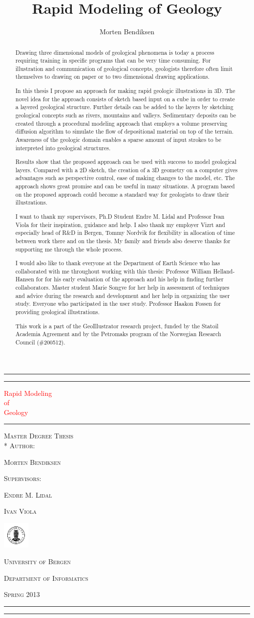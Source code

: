 \documentclass[a4paper,12pt]{report}
\title{Rapid Modeling of Geology}
\author{Morten Bendiksen}
\newcommand*{\plogo}{\includegraphics[width=0.1\textwidth]{uiblogo.pdf}} %
\newcommand*{\titleAT}{\begingroup %
\newlength{\drop} %
\drop=0.06\textheight %

\rule{\textwidth}{1pt}\par %
\vspace{2pt}\vspace{-\baselineskip} %
\rule{\textwidth}{0.4pt}\par %

\vspace{\drop} %
\centering %
\textcolor{Red}{ %
{\Huge Rapid Modeling}\\[0.5\baselineskip] %
{\Large of}\\[0.75\baselineskip] %
{\Huge Geology}} %

\vspace{0.25\drop} %
\rule{0.3\textwidth}{0.4pt}\par %
\vspace{\drop} %


{ 
\textsc{Master Degree Thesis}\\*
\vspace{2\drop}
\textsc{Author:}}\par %
\vspace{0.2\drop}
{\Large \textsc{Morten Bendiksen}}\par %
\vspace{0.5\drop}
{ \textsc{Supervisors:}}\par 
\vspace{0.2\drop}
{\Large \textsc{Endre M. Lidal}}\par 

\vspace{0.1\drop}
{\Large \textsc{Ivan Viola}}\par 

\vfill %


{\large \textcolor{Red}{\plogo}}\par %
{\large \textsc{University of Bergen}}\par %
{\large \textsc{Department of Informatics}}\par %
{\large \textsc{Spring 2013}}\par %

\vspace*{\drop} %

\rule{\textwidth}{0.4pt}\par %
\vspace{2pt}\vspace{-\baselineskip} %
\rule{\textwidth}{1pt}\par %

\endgroup}
\begin{document}
\pagestyle{empty} 
\titleAT


\clearpage
\begin{abstract}


Drawing three dimensional models of geological phenomena is today a process requiring training in specific programs that can be very time consuming. For illustration and communication of geological concepts, geologists therefore often limit themselves to drawing on paper or to two dimensional drawing applications.

In this thesis I propose an approach for making rapid geologic illustrations in 3D. The novel idea for the approach consists of sketch based input on a cube in order to create a layered geological structure. Further details can be added to the layers by sketching geological concepts such as rivers, mountains and valleys. Sedimentary deposits can be created through a procedural modeling approach that employs a volume preserving diffusion algorithm to simulate the flow of depositional material on top of the terrain. Awareness of the geologic domain enables a sparse amount of input strokes to be interpreted into geological structures.

Results show that the proposed approach can be used with success to model geological layers. Compared with a 2D sketch, the creation of a 3D geometry on a computer gives advantages such as perspective control, ease of making changes to the model, etc. The approach shows great promise and can be useful in many situations. A program based on the proposed approach could become a standard way for geologists to draw their illustrations.
\end{abstract}

\renewcommand{\abstractname}{Acknowledgements}
\begin{abstract}

I want to thank my supervisors, Ph.D Student Endre M. Lidal and Professor Ivan Viola for their inspiration, guidance and help. I also thank my employer Vizrt and especially head of R\&D in Bergen, Tommy Nordvik for flexibility in allocation of time between work there and on the thesis. My family and friends also deserve thanks for supporting me through the whole process.

I would also like to thank everyone at the Department of Earth Science who has collaborated with me throughout working with this thesis: Professor William Helland-Hansen for for his early evaluation of the approach and his help in finding further collaborators. Master student Marie Songve for her help in assessment of techniques and advice during the research and development and her help in organizing the user study. Everyone who participated in the user study. Professor Haakon Fossen for providing geological illustrations. 

This work is a part of the GeoIllustrator research project, funded by the Statoil Academia Agreement and by the Petromaks program of the Norwegian Research Council (\#200512).
\end{abstract}
\end{document}
